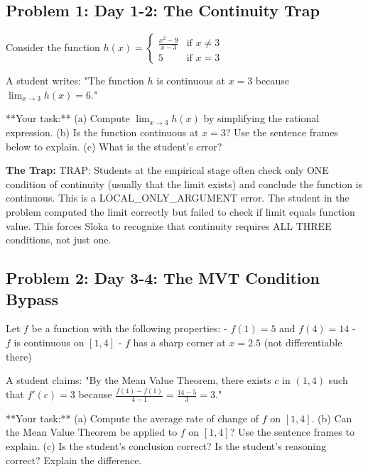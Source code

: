 \documentclass[11pt,letterpaper]{article}
\begin{document}
\vspace{0.3cm}


\subsection*{Problem 1: Day 1-2: The Continuity Trap}

\begin{tcolorbox}[colback=blue!5!white, colframe=blue!50, arc=2mm]
  Consider the function $h(x) = \begin{cases} \frac{x^2 - 9}{x - 3} & \text{if } x \neq 3 \\ 5 & \text{if } x = 3 \end{cases}$

A student writes: "The function $h$ is continuous at $x = 3$ because $\lim_{x \to 3} h(x) = 6$."

**Your task:** 
(a) Compute $\lim_{x \to 3} h(x)$ by simplifying the rational expression.
(b) Is the function continuous at $x = 3$? Use the sentence frames below to explain.
(c) What is the student's error?
\end{tcolorbox}

\textbf{The Trap:} TRAP: Students at the empirical stage often check only ONE condition of continuity (usually that the limit exists) and conclude the function is continuous. This is a LOCAL_ONLY_ARGUMENT error. The student in the problem computed the limit correctly but failed to check if limit equals function value. This forces Sloka to recognize that continuity requires ALL THREE conditions, not just one.

\vspace{0.5cm}


\subsection*{Problem 2: Day 3-4: The MVT Condition Bypass}

\begin{tcolorbox}[colback=blue!5!white, colframe=blue!50, arc=2mm]
  Let $f$ be a function with the following properties:
- $f(1) = 5$ and $f(4) = 14$
- $f$ is continuous on $[1, 4]$
- $f$ has a sharp corner at $x = 2.5$ (not differentiable there)

A student claims: "By the Mean Value Theorem, there exists $c$ in $(1, 4)$ such that $f'(c) = 3$ because $\frac{f(4) - f(1)}{4 - 1} = \frac{14 - 5}{3} = 3$."

**Your task:**
(a) Compute the average rate of change of $f$ on $[1, 4]$.
(b) Can the Mean Value Theorem be applied to $f$ on $[1, 4]$? Use the sentence frames to explain.
(c) Is the student's conclusion correct? Is the student's reasoning correct? Explain the difference.
\end{tcolorbox}
\end{document}
